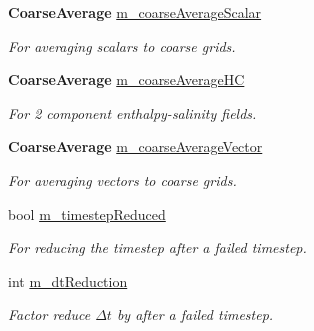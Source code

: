 \begin{DoxyCompactItemize}
\mbox{\label{class_a_m_r_level_mushy_layer_af0e2d84fa6c2cf813bf25f1bb4c880ab}} 
\textbf{ Coarse\+Average} \hyperlink{class_a_m_r_level_mushy_layer_af0e2d84fa6c2cf813bf25f1bb4c880ab}{m\+\_\+coarse\+Average\+Scalar}
\begin{DoxyCompactList}\small\item\em For averaging scalars to coarse grids. \end{DoxyCompactList}\item 
\mbox{\label{class_a_m_r_level_mushy_layer_a22ba6f41aa7c557ac01cf6cb9e5fc8c9}} 
\textbf{ Coarse\+Average} \hyperlink{class_a_m_r_level_mushy_layer_a22ba6f41aa7c557ac01cf6cb9e5fc8c9}{m\+\_\+coarse\+Average\+HC}
\begin{DoxyCompactList}\small\item\em For 2 component enthalpy-\/salinity fields. \end{DoxyCompactList}\item 
\mbox{\label{class_a_m_r_level_mushy_layer_a992715b841cd44d7dbb64cd99acb9306}} 
\textbf{ Coarse\+Average} \hyperlink{class_a_m_r_level_mushy_layer_a992715b841cd44d7dbb64cd99acb9306}{m\+\_\+coarse\+Average\+Vector}
\begin{DoxyCompactList}\small\item\em For averaging vectors to coarse grids. \end{DoxyCompactList}\item 
\mbox{\label{class_a_m_r_level_mushy_layer_aaaff66ec4a08d3d90fdee05a2a67cede}} 
bool \hyperlink{class_a_m_r_level_mushy_layer_aaaff66ec4a08d3d90fdee05a2a67cede}{m\+\_\+timestep\+Reduced}
\begin{DoxyCompactList}\small\item\em For reducing the timestep after a failed timestep. \end{DoxyCompactList}\item 
\mbox{\label{class_a_m_r_level_mushy_layer_a514c73fd99d14fb7e4ce39b50636f6ce}} 
int \hyperlink{class_a_m_r_level_mushy_layer_a514c73fd99d14fb7e4ce39b50636f6ce}{m\+\_\+dt\+Reduction}
\begin{DoxyCompactList}\small\item\em Factor reduce $ \Delta t $ by after a failed timestep. \end{DoxyCompactList}\item 

\end{DoxyCompactItemize}
